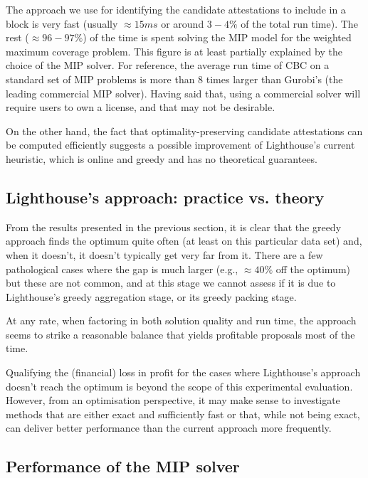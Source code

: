 \documentclass{article}
\begin{document}
The approach we use for identifying the candidate attestations to include in a
block is very fast (usually $\approx 15ms$ or around $3-4\%$ of the total run
time). The rest ($\approx 96-97\%$) of the time is spent solving the MIP model
for the weighted maximum coverage problem. This figure is at least partially
explained by the choice of the MIP solver. For reference, the average run time
of CBC on a standard set of MIP problems is more than 8 times larger than
Gurobi's \cite{gurobi} (the leading commercial MIP solver). Having said that,
using a commercial solver will require users to own a license, and that may
not be desirable.  

On the other hand, the fact that optimality-preserving candidate attestations
can be computed efficiently suggests a possible improvement of Lighthouse's
current heuristic, which is online and greedy and has no theoretical
guarantees.

\subsection{Lighthouse's approach: practice vs. theory}

From the results presented in the previous section, it is clear that the greedy
approach finds the optimum quite often (at least on this particular data set)
and, when it doesn't, it doesn't typically get very far from it.  There are a
few pathological cases where the gap is much larger (e.g., $\approx 40\%$ off
the optimum) but these are not common, and at this stage we cannot assess if it
is due to Lighthouse's greedy aggregation stage, or its greedy packing stage. 

At any rate, when factoring in both solution quality and run time, the approach
seems to strike a reasonable balance that yields profitable proposals most of
the time.

Qualifying the (financial) loss in profit for the cases where Lighthouse's
approach doesn't reach the optimum is beyond the scope of this experimental
evaluation. However, from an optimisation perspective, it may make sense to
investigate methods that are either exact and sufficiently fast or that, while
not being exact, can deliver better performance than the current approach more
frequently.

\subsection{Performance of the MIP solver}
\end{document}
